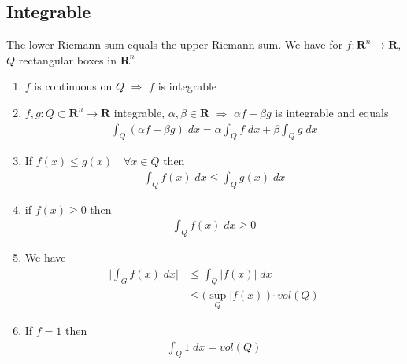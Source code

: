 \documentclass[8pt]{extarticle}
\newcommand{\R}{{\mathbb R}}
\newcommand{\ra}{{\rightarrow}}
\newcommand{\Ra}{{\Rightarrow}}
\def\R{\mathbf{R}}
\begin{document}
\begin{multicols*}{3}
  \subsection{Integrable}
  The lower Riemann sum equals the upper Riemann sum. We have
  for $f: \R^n \ra \R$, $Q$ rectangular boxes in $\R^n$
  \begin{enumerate}[label=(\arabic*)]
    \item $f$ is continuous on $Q$ $\Ra$ $f$ is integrable
    \item $f, g: Q \subset \R^n \ra \R$ integrable, $\alpha, \beta \in \R$
          $\Ra$ $\alpha f + \beta g$ is integrable and equals
          \begin{align*}
            \int_Q (\alpha f + \beta g) \; dx = \alpha \int_Q f \; dx + \beta \int_Q g \; dx
          \end{align*}
    \item If $f(x) \leq g(x) \quad \forall x \in Q$ then
          \begin{align*}
            \int_Q f(x) \; dx \leq \int_Q g(x) \; dx
          \end{align*}
    \item if $f(x) \geq 0$ then
          \begin{align*}
            \int_Q f(x) \; dx \geq 0
          \end{align*}
    \item We have
          \begin{align*}
            \Big |  \int_G f(x) \; dx  \Big | & \leq \int_Q | f(x) | \; dx                  \\
                                              & \leq \Big( \sup_Q |f(x)| \Big) \cdot vol(Q)
          \end{align*}
    \item If $f = 1$ then
          \begin{align*}
            \int_Q 1 \; dx = vol(Q)
          \end{align*}
  \end{enumerate}

\end{multicols*}
\end{document}
